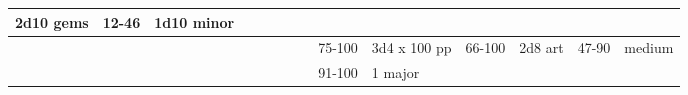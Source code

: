 \begin{longtable}{llllllllllllll}
{\begin{minipage}[t]{0.469in}
2d10 gems\end{minipage}} & \multicolumn{1}{p{0.626in}|}{\begin{minipage}[t]{0.626in}\raggedright
12-46\end{minipage}} & \multicolumn{1}{p{0.469in}|}{\begin{minipage}[t]{0.469in}\centering
1d10 minor\end{minipage}}\\
\hline
\multicolumn{8}{p{1.150in}|}{\begin{minipage}[t]{1.150in}\centering
\end{minipage}} & \multicolumn{1}{|p{0.393in}|}{\begin{minipage}[t]{0.393in}\raggedright
75-100\end{minipage}} & \multicolumn{1}{p{0.469in}|}{\begin{minipage}[t]{0.469in}\raggedright
3d4 x 100 pp\end{minipage}} & \multicolumn{1}{p{0.923in}|}{\begin{minipage}[t]{0.923in}\raggedright
66-100\end{minipage}} & \multicolumn{1}{p{0.469in}|}{\begin{minipage}[t]{0.469in}\raggedright
2d8 art\end{minipage}} & \multicolumn{1}{p{0.626in}|}{\begin{minipage}[t]{0.626in}\raggedright
47-90\end{minipage}} & \multicolumn{1}{p{0.469in}|}{\begin{minipage}[t]{0.469in}\centering
1 medium\end{minipage}}\\
\hline
\multicolumn{8}{p{1.150in}|}{\begin{minipage}[t]{1.150in}\centering
\end{minipage}} & \multicolumn{1}{|p{0.393in}|}{\begin{minipage}[t]{0.393in}\raggedright
91-100\end{minipage}} & \multicolumn{1}{p{0.469in}|}{\begin{minipage}[t]{0.469in}\raggedright
1 major\end{minipage}} & \multicolumn{1}{p{0.923in}|}{\begin{minipage}[t]{0.923in}\raggedright
\end{minipage}} & \multicolumn{1}{p{0.469in}|}{\begin{minipage}[t]{0.469in}\raggedright
\end{minipage}} & \multicolumn{1}{p{0.626in}|}{\begin{minipage}[t]{0.626in}\raggedright

\end{minipage}}
\end{longtable}

